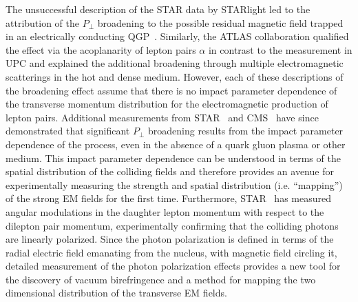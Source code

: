 \documentclass[12pt,epjc3]{svjour3}\sloppy
\begin{document}
The unsuccessful description of the STAR data by STARlight led to the attribution of the $P_\perp$ broadening to the possible residual magnetic field trapped in an electrically conducting QGP~\cite{mclerranCommentsElectromagneticField2014}. 
Similarly, the ATLAS collaboration qualified the effect via the acoplanarity of lepton pairs $\alpha$ in contrast to the measurement in UPC and explained the additional broadening through multiple electromagnetic scatterings in the hot and dense medium. 
However, each of these descriptions of the broadening effect assume that there is no impact parameter dependence of the transverse momentum distribution for the electromagnetic production of lepton pairs.
Additional measurements from STAR~\cite{starcollaborationMeasurementMomentumAngular2021} and CMS~\cite{cmscollaborationObservationForwardNeutron2020a} have since demonstrated that significant $P_\perp$ broadening results from the impact parameter dependence of the process, even in the absence of a quark gluon plasma or other medium. 
This impact parameter dependence can be understood in terms of the spatial distribution of the colliding fields and therefore provides an avenue for experimentally measuring the strength and spatial distribution (i.e. ``mapping'') of the strong EM fields for the first time.
Furthermore, STAR~\cite{starcollaborationMeasurementMomentumAngular2021} has measured angular modulations in the daughter lepton momentum with respect to the dilepton pair momentum, experimentally confirming that the colliding photons are linearly polarized.
Since the photon polarization is defined in terms of the radial electric field emanating from the nucleus, with magnetic field circling it, detailed measurement of the photon polarization effects provides a new tool for the discovery of vacuum birefringence and a method for mapping the two dimensional distribution of the transverse EM fields.
\end{document}
